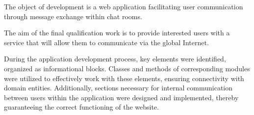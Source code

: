 The object of development is a web application facilitating user communication through message exchange within chat rooms.

The aim of the final qualification work is to provide interested users with a service that will allow them to communicate via the global Internet.

During the application development process, key elements were identified, organized as informational blocks. Classes and methods of corresponding modules were utilized to effectively work with these elements, ensuring connectivity with domain entities. Additionally, sections necessary for internal communication between users within the application were designed and implemented, thereby guaranteeing the correct functioning of the website.
